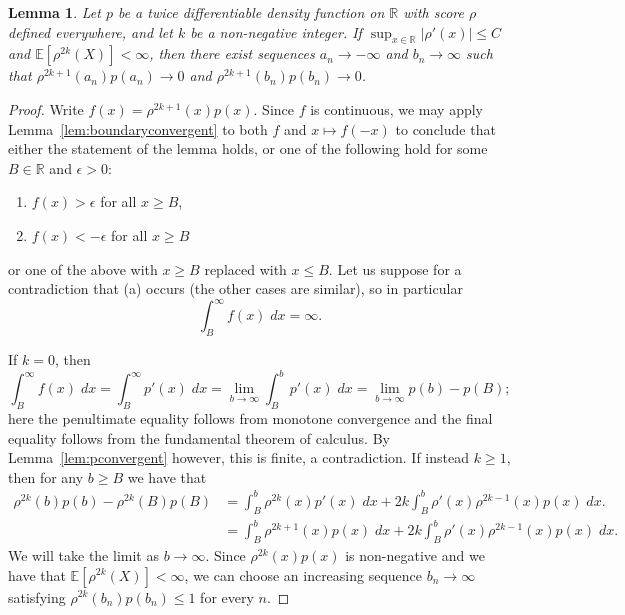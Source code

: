 \documentclass[aos]{imsart}
\newcommand{\R}{\mathbb{R}}
\newcommand{\E}{\mathbb{E}}
\newtheorem{lemma}[theorem]{Lemma}
\begin{document}
	
	\begin{lemma}
		\label{lem:scoreboundaryconvergent}
		Let $p$ be a twice differentiable density function on $\R$ with score $\rho$ defined everywhere, and let $k$ be a non-negative integer. If $\sup_{x\in\R} |\rho'(x)| \leq C$ and $\E[\rho^{2k}(X)]<\infty$, then there exist sequences $a_n \to -\infty$ and $b_n \to \infty$ such that $\rho^{2k+1}(a_n)p(a_n) \to 0$ and $\rho^{2k+1}(b_n)p(b_n) \to 0$.%
	\end{lemma}
	\begin{proof}
		Write $f(x)=\rho^{2k+1}(x)p(x)$. Since $f$ is continuous, we may apply Lemma~\ref{lem:boundaryconvergent} to both $f$ and $x \mapsto f(-x)$ to conclude that either the statement of the lemma holds, or one of the following hold for some $B \in \R$ and $\epsilon > 0$:
		\begin{enumerate}[label=(\alph*)]
			\item $f(x) > \epsilon$ for all $x \geq B$,
			\item $f(x) < - \epsilon$ for all $x \geq B$
		\end{enumerate}
		or one of the above with $x \geq B$ replaced with $x \leq B$. Let us suppose for a contradiction that (a) occurs (the other cases are similar), so in particular
		\begin{equation}
			\int_{B}^\infty f(x)\; dx = \infty. \label{eqn:rho2k+1contradictioninfinite}
		\end{equation}
		
		
		If $k=0$, then \begin{equation*}
			\int_B^\infty f(x)\;dx = \int_B^\infty p'(x)\;dx = \lim_{b \to \infty} \int_B^b p'(x)\;dx = \lim_{b\to\infty} p(b) - p(B);
		\end{equation*}
		here the penultimate equality follows from monotone convergence and the final equality follows from the fundamental theorem of calculus.
		By Lemma~\ref{lem:pconvergent} however, this is finite, a contradiction. If instead $k\geq 1$, then for any $b\geq B$ we have that \begin{align}
			\rho^{2k}(b)p(b)-\rho^{2k}(B)p(B) &= \int_B^b \rho^{2k}(x)p'(x)\; dx + 2k\int_B^b \rho'(x)\rho^{2k-1}(x)p(x)\;dx.\nonumber\\
			&= \int_B^b \rho^{2k+1}(x)p(x)\; dx + 2k\int_B^b \rho'(x)\rho^{2k-1}(x)p(x)\;dx.\label{eqn:rho2k+1contradictionfinite}
		\end{align}
		We will take the limit as $b\to\infty$. Since $\rho^{2k}(x)p(x)$ is non-negative and we have that $\E[\rho^{2k}(X)]<\infty$, we can choose an increasing sequence $b_n\to\infty$ satisfying $\rho^{2k}(b_n)p(b_n) \leq 1$ for every $n$. 
		

\end{proof}
\end{document}
